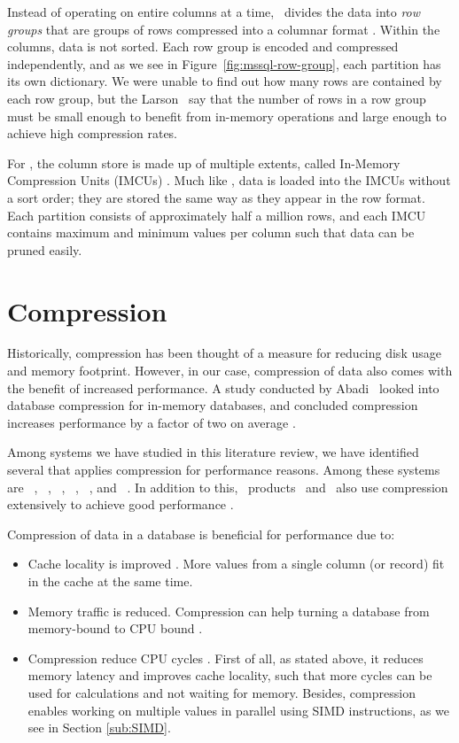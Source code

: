 Instead of operating on entire columns at a time, \mssql~divides the data into \textit{row groups} that are groups of rows compressed into a columnar format \cite{Larson2013-mc}. Within the columns, data is not sorted. Each row group is encoded and compressed independently, and as we see in Figure~\ref{fig:mssql-row-group}, each partition has its own dictionary. We were unable to find out how many rows are contained by each row group, but the Larson \ea~say that the number of rows in a row group must be small enough to benefit from in-memory operations and large enough to achieve high compression rates. 

For \oracle, the column store is made up of multiple extents, called In-Memory Compression Units (IMCUs) \cite{Lahiri2015-mz}. Much like \mssql, data is loaded into the IMCUs without a sort order; they are stored the same way as they appear in the row format. Each partition consists of approximately half a million rows, and each IMCU contains maximum and minimum values per column such that data can be pruned easily. 

\section{Compression}
\label{sec:Compression}
Historically, compression has been thought of a measure for reducing disk usage and memory footprint. However, in our case, compression of data also comes with the benefit of increased performance. A study conducted by Abadi \ea~looked into database compression for in-memory databases, and concluded compression increases performance by a factor of two on average \cite{Abadi2008-dd}.

Among systems we have studied in this literature review, we have identified several that applies compression for performance reasons. Among these systems are \ibm~\cite{Raman2013-em}, \cstore~\cite{Stonebraker2005-qz}, \vertica~\cite{Lamb2012-kg}, \oracle~\cite{Oracle2015-fs}, \gorilla~\cite{Pelkonen2015-ko}, and \exasol~\cite{Exasol2014-xh}. In addition to this, \bd~products \tableau~and \qlikview~also use compression extensively to achieve good performance \cite{Kamkolkar2015-iq, Qlik2014-vd}. 

Compression of data in a database is beneficial for performance due to:
\begin{itemize}
  \item Cache locality is improved \cite{Exasol2014-xh}. More values from a single column (or record) fit in the cache at the same time.
  \item Memory traffic is reduced. Compression can help turning a database from memory-bound to CPU bound \cite{Willhalm2009-hu}.
  \item Compression reduce CPU cycles \cite{Stonebraker2005-qz}. First of all, as stated above, it reduces memory latency and improves cache locality, such that more cycles can be used for calculations and not waiting for memory. Besides, compression enables working on multiple values in parallel using SIMD instructions, as we see in Section \ref{sub:SIMD}.
\end{itemize}

